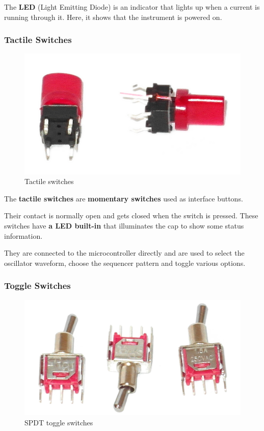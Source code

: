 \documentclass{scrartcl}
\begin{document}
The \textbf{LED} (Light Emitting Diode) is an indicator that lights up when a current is running through it.
Here, it shows that the instrument is powered on.

\subsubsection{Tactile Switches}

\begin{figure}[!ht]
    \begin{center}
        \includegraphics[scale=0.20]{assets/zekit-tacts.jpg}
        \caption{Tactile switches}
    \end{center}
\end{figure}

The \textbf{tactile switches} are \textbf{momentary switches} used as interface buttons.

Their contact is normally open and gets closed when the switch is pressed. These switches have \textbf{a LED built-in} that illuminates the cap to show some status information.

They are connected to the microcontroller directly and are used to select the oscillator waveform, choose the sequencer pattern and toggle various options.

\subsubsection{Toggle Switches}

\begin{figure}[!ht]
    \begin{center}
        \includegraphics[scale=0.16]{assets/zekit-toggles.jpg}
        \caption{SPDT toggle switches}
    \end{center}
\end{figure}
\end{document}
